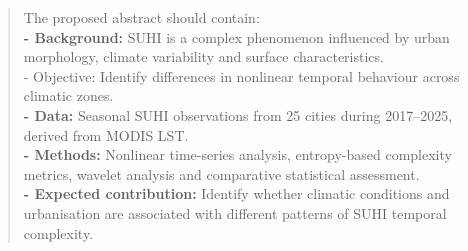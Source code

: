 \begin{abstract}
The proposed abstract should contain:\\%
\textbf{- Background:} SUHI is a complex phenomenon influenced by urban morphology, climate variability and surface characteristics.\\%
- Objective: Identify differences in nonlinear temporal behaviour across climatic zones.\\%
\textbf{- Data:} Seasonal SUHI observations from 25 cities during 2017–2025, derived from MODIS LST.\\%
\textbf{- Methods: }Nonlinear time-series analysis, entropy-based complexity metrics, wavelet analysis and comparative statistical assessment.\\%
\textbf{- Expected contribution:} Identify whether climatic conditions and urbanisation are associated with different patterns of SUHI temporal complexity.
\end{abstract}